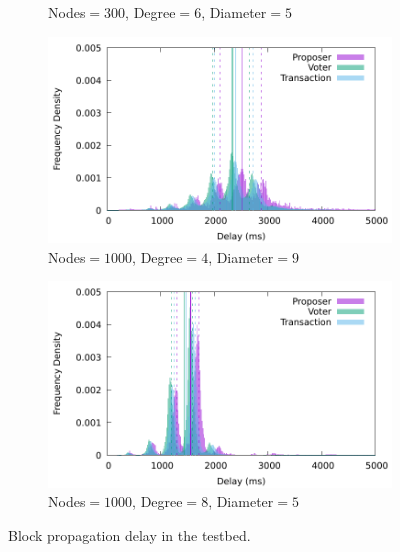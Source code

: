 \begin{figure}[t]
\begin{subfigure}{.5\textwidth}
   \caption{Nodes$=300$, Degree$=6$, Diameter$=5$}%
   \label{fig:propagation3}
 \end{subfigure}%
    \begin{subfigure}{.5\textwidth}
   \centering
   \includegraphics[width=\linewidth]{figures/delay1000nodes4.pdf}
   \caption{Nodes$=1000$, Degree$=4$, Diameter$=9$}%
   \label{fig:propagation4}
 \end{subfigure}%
    \newline
    \begin{subfigure}{.5\textwidth}
   \centering
   \includegraphics[width=\linewidth]{figures/delay1000nodes8.pdf}
   \caption{Nodes$=1000$, Degree$=8$, Diameter$=5$}
   \label{fig:propagation5}
 \end{subfigure}
 
    \caption{Block propagation delay in the testbed.}
    \label{fig:propagation}
\end{figure}
